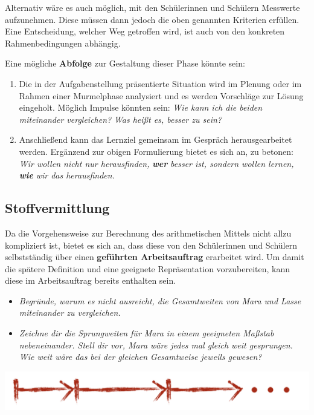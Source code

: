 \documentclass[
]{scrbook}
\providecommand{\tightlist}{%
  \setlength{\itemsep}{0pt}\setlength{\parskip}{0pt}}
\theoremstyle{definition}
\theoremstyle{definition}
\theoremstyle{definition}
\theoremstyle{definition}
\theoremstyle{remark}
\begin{document}
Alternativ wäre es auch möglich, mit den Schülerinnen und Schülern Messwerte aufzunehmen. Diese müssen dann jedoch die oben genannten Kriterien erfüllen. Eine Entscheidung, welcher Weg getroffen wird, ist auch von den konkreten Rahmenbedingungen abhängig.

Eine mögliche \textbf{Abfolge} zur Gestaltung dieser Phase könnte sein:

\begin{enumerate}
\def\labelenumi{\arabic{enumi}.}
\tightlist
\item
  Die in der Aufgabenstellung präsentierte Situation wird im Plenung oder im Rahmen einer Murmelphase analysiert und es werden Vorschläge zur Lösung eingeholt. Möglich Impulse könnten sein: \emph{Wie kann ich die beiden miteinander vergleichen?} \emph{Was heißt es, besser zu sein?}
\item
  Anschließend kann das Lernziel gemeinsam im Gespräch herausgearbeitet werden. Ergänzend zur obigen Formulierung bietet es sich an, zu betonen: \emph{Wir wollen nicht nur herausfinden,} \textbf{\emph{wer}} \emph{besser ist, sondern wollen lernen,} \textbf{\emph{wie}} \emph{wir das herausfinden.}
\end{enumerate}

\subsection{Stoffvermittlung}\label{stoffvermittlung}

Da die Vorgehensweise zur Berechnung des arithmetischen Mittels nicht allzu kompliziert ist, bietet es sich an, dass diese von den Schülerinnen und Schülern selbstständig über einen \textbf{geführten Arbeitsauftrag} erarbeitet wird. Um damit die spätere Definition und eine geeignete Repräsentation vorzubereiten, kann diese im Arbeitsauftrag bereits enthalten sein.

\begin{itemize}
\tightlist
\item
  \emph{Begründe, warum es nicht ausreicht, die Gesamtweiten von Mara und Lasse miteinander zu vergleichen.}\\
\item
  \emph{Zeichne dir die Sprungweiten für Mara in einem geeigneten Maßstab nebeneinander. Stell dir vor, Mara wäre jedes mal gleich weit gesprungen. Wie weit wäre das bei der gleichen Gesamtweise jeweils gewesen?}
\end{itemize}

\begin{center}\includegraphics[width=0.5\linewidth]{pictures/B-Einfuehrung} \end{center}
\end{document}
